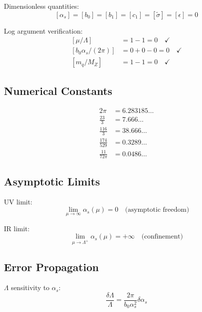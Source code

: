 \documentclass[11pt,a4paper]{article}
\theoremstyle{definition}
\begin{document}
Dimensionless quantities:
\begin{equation}
\label{eq:app-20}
[\alpha_s] = [b_0] = [b_1] = [c_1] = [\tilde{\sigma}] = [\epsilon] = 0
\end{equation}

Log argument verification:
\begin{align}
\label{eq:app-21}
[\mu/\Lambda] &= 1 - 1 = 0 \quad \checkmark \\
\label{eq:app-22}
[b_0\alpha_s/(2\pi)] &= 0 + 0 - 0 = 0 \quad \checkmark \\
\label{eq:app-23}
[m_q/M_Z] &= 1 - 1 = 0 \quad \checkmark
\end{align}

\subsection{Numerical Constants}
\label{subsec:app-num}

\begin{align}
\label{eq:app-24}
2\pi &= 6.283185\ldots \\
\label{eq:app-25}
\frac{23}{3} &= 7.666\ldots \\
\label{eq:app-26}
\frac{116}{3} &= 38.666\ldots \\
\label{eq:app-27}
\frac{174}{529} &= 0.3289\ldots \\
\label{eq:app-28}
\frac{11}{72\pi} &= 0.0486\ldots
\end{align}

\subsection{Asymptotic Limits}
\label{subsec:app-asymp}

UV limit:
\begin{equation}
\label{eq:app-29}
\lim_{\mu \to \infty} \alpha_s(\mu) = 0 \quad \text{(asymptotic freedom)}
\end{equation}

IR limit:
\begin{equation}
\label{eq:app-30}
\lim_{\mu \to \Lambda^+} \alpha_s(\mu) = +\infty \quad \text{(confinement)}
\end{equation}

\subsection{Error Propagation}
\label{subsec:app-error}

$\Lambda$ sensitivity to $\alpha_s$:
\begin{equation}
\label{eq:app-31}
\frac{\delta\Lambda}{\Lambda} = \frac{2\pi}{b_0\alpha_s^2}\delta\alpha_s
\end{equation}
\end{document}
